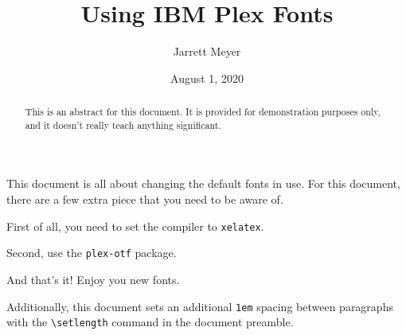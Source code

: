 \documentclass[letterpaper]{article}
\title{Using IBM Plex Fonts}
\author{Jarrett Meyer}
\date{August 1, 2020}
\begin{document}
\maketitle

\begin{abstract}
	This is an abstract for this document. It is provided for demonstration purposes only, and it doesn't really teach anything significant.
\end{abstract}

This document is all about changing the default fonts in use. For this document, there are a few extra piece that you need to be aware of.

First of all, you need to set the compiler to \texttt{xelatex}.

Second, use the \texttt{plex-otf} package.

And that's it! Enjoy you new fonts.

Additionally, this document sets an additional \texttt{1em} spacing between paragraphs with the \texttt{\textbackslash{}setlength} command in the document preamble.
\end{document}

